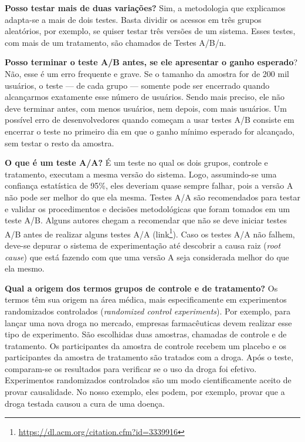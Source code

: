 \documentclass[
  11pt,
  twoside]{book}
\DeclareRobustCommand{\href}[2]{#2\footnote{\url{#1}}}
\begin{document}
\textbf{Posso testar mais de duas variações?} Sim, a metodologia que
explicamos adapta-se a mais de dois testes. Basta dividir os acessos em
três grupos aleatórios, por exemplo, se quiser testar três versões de um
sistema. Esses testes, com mais de um tratamento, são chamados de Testes
A/B/n.

\textbf{Posso terminar o teste A/B antes, se ele apresentar o ganho
esperado}? Não, esse é um erro frequente e grave. Se o tamanho da
amostra for de 200 mil usuários, o teste --- de cada grupo --- somente
pode ser encerrado quando alcançarmos exatamente esse número de
usuários. Sendo mais preciso, ele não deve terminar antes, com menos
usuários, nem depois, com mais usuários. Um possível erro de
desenvolvedores quando começam a usar testes A/B consiste em encerrar o
teste no primeiro dia em que o ganho mínimo esperado for alcançado, sem
testar o resto da amostra.


\textbf{O que é um teste A/A?} É um teste no qual os dois grupos,
controle e tratamento, executam a mesma versão do sistema. Logo,
assumindo-se uma confiança estatística de 95\%, eles deveriam quase
sempre falhar, pois a versão A não pode ser melhor do que ela mesma.
Testes A/A são recomendados para testar e validar os procedimentos e
decisões metodológicas que foram tomados em um teste A/B. Alguns autores
chegam a recomendar que não se deve iniciar testes A/B antes de realizar
alguns testes A/A
(\href{https://dl.acm.org/citation.cfm?id=3339916}{link}). Caso os
testes A/A não falhem, deve-se depurar o sistema de experimentação até
descobrir a causa raiz (\emph{root cause}) que está fazendo com que uma
versão A seja considerada melhor do que ela mesmo.

\textbf{Qual a origem dos termos grupos de controle e de tratamento?} Os
termos têm sua origem na área médica, mais especificamente em
experimentos randomizados controlados (\emph{randomized control
experiments}). Por exemplo, para lançar uma nova droga no mercado,
empresas farmacêuticas devem realizar esse tipo de experimento. São
escolhidas duas amostras, chamadas de controle e de tratamento. Os
participantes da amostra de controle recebem um placebo e os
participantes da amostra de tratamento são tratados com a droga. Após o
teste, comparam-se os resultados para verificar se o uso da droga foi
efetivo. Experimentos randomizados controlados são um modo
cientificamente aceito de provar causalidade. No nosso exemplo, eles
podem, por exemplo, provar que a droga testada causou a cura de uma
doença.
\end{document}
